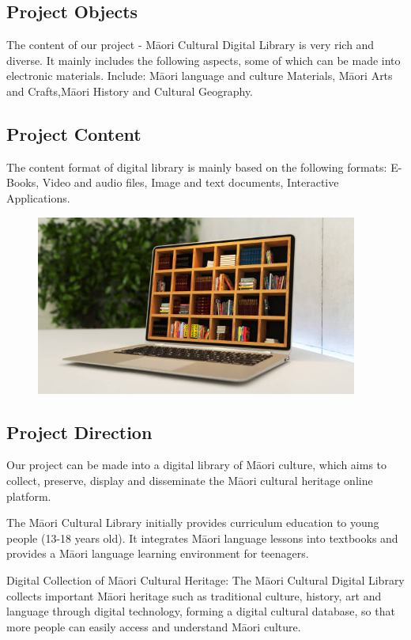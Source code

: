 \subsection{Project Objects}
The content of our project - Māori Cultural Digital Library is very rich and diverse. It mainly includes the following aspects, some of which can be made into electronic materials. Include: Māori language and culture Materials, Māori Arts and Crafts,Māori History and Cultural Geography.

\subsection{Project Content}
The content format of digital library is mainly based on the following formats:
E-Books, Video and audio files, Image and text documents, Interactive Applications.

\begin{figure}[htbp]
  \centerline{\includegraphics[width=300pt]{images/M1-2-1.png}}
\end{figure}

\subsection{Project Direction}
Our project can be made into a digital library of Māori culture, which aims to collect, preserve, display and disseminate the Māori cultural heritage online platform.

The Māori Cultural Library initially provides curriculum education to young people (13-18 years old). It integrates Māori language lessons into textbooks and provides a Māori language learning environment for teenagers.

Digital Collection of Māori Cultural Heritage: The Māori Cultural Digital Library collects important Māori heritage such as traditional culture, history, art and language through digital technology, forming a digital cultural database, so that more people can easily access and understand Māori culture.

